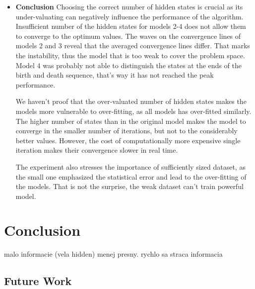 \documentclass[thesis=M,english]{FITthesis}[2012/10/20]
\begin{document}
\begin{itemize}
\item \textbf{ Conclusion }
Choosing the correct number of hidden states is crucial as its under-valuating can negatively influence the performance of the algorithm. Insufficient number of the hidden states for models 2-4 does not allow them to converge to the optimum values. The waves on the convergence lines of models 2 and 3 reveal that the averaged convergence lines differ. That marks the instability, thus the model that is too weak to cover the problem space. Model 4 was probably not able to distinguish the states at the ends of the birth and death sequence, that's way it has not reached the peak performance.

We haven't proof that the over-valuated number of hidden states makes the models more vulnerable to over-fitting, as all models has over-fitted similarly. The higher number of states than in the original model makes the model to converge in the smaller number of iterations, but not to the considerably better values. However, the cost of computationally more expensive single iteration makes their convergence slower in real time.

The experiment also stresses the importance of sufficiently sized dataset, as the small one emphasized the statistical error and lead to the over-fitting of the models. That is not the surprise, the weak dataset can't train powerful model. 
\end{itemize}






\chapter{Conclusion}

malo informacie (vela hidden) menej presny.
rychlo sa straca informacia 

\section{Future Work}
\end{document}
